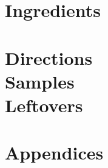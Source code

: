 \documentclass[10pt]{report}
\begin{document}






\part{Ingredients}
\label{part:ing}









\part[Directions, samples and leftovers]{Directions \\ Samples \\ Leftovers}
\label{part:dir}









\printbibliography

\appendix

\part{Appendices}


\end{document}

